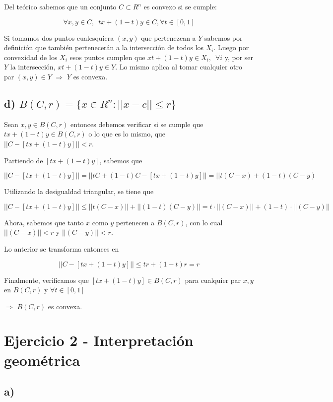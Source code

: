 \documentclass[10pt,a4paper]{report}
\begin{document}
	Del teórico sabemos que un conjunto $C \subset R^n$ es convexo si se cumple:
	
	$$\forall x,y \in C,\hspace{6pt} tx + (1-t)y \in C, \forall t \in [0,1]$$
	
	Si tomamos dos puntos cualesquiera $(x,y)$ que pertenezcan a $Y$ sabemos por definición que también pertenecerán a la intersección de todos los $X_i$. Luego por convexidad de los $X_i$ esos puntos cumplen que $xt + (1-t)y \in X_i, \hspace{6pt} \forall i$ y, por ser $Y$ la intersección, $xt + (1-t)y \in Y$. Lo mismo aplica al tomar cualquier otro par $(x,y)\in Y$ $\Rightarrow$ $Y$ es convexa. 
	
	\subsection*{d) $ B(C,r) = \{x \in R^n : ||x-c|| \leq r\} $}
	
	Sean $x,y \in B(C,r)$ entonces debemos verificar si se cumple que $tx + (1-t)y \in B(C,r)$ o lo que es lo mismo, que 
	$||C - [tx + (1-t)y]|| < r$. 
	
	Partiendo de $[tx + (1-t)y]$, sabemos que
	
	$$||C - [tx + (1-t)y]|| = ||tC + (1-t)C - [tx + (1-t)y]|| = || t(C - x) + (1-t) (C - y) $$
	
	Utilizando la desigualdad triangular, se tiene que 
	
	$$||C - [tx + (1-t)y]|| \leq ||t(C-x)|| + ||(1-t)(C-y)|| = t\cdot||(C-x)|| + (1-t)\cdot||(C-y)||$$
	
	Ahora, sabemos que tanto $x$ como $y$ pertenecen a $B(C,r)$, con lo cual $||(C-x)|| < r$ y $||(C-y)|| < r$.
	
	Lo anterior se transforma entonces en
	
	$$||C - [tx + (1-t)y]|| \leq tr + (1-t)r = r$$
	
	Finalmente, verificamos que $[tx + (1-t)y] \in B(C,r)$ para cualquier par $x,y$ en $B(C,r)$ y $\forall t \in [0,1]$ 
	
	$\Rightarrow$ $B(C,r)$ es convexa.
	
	\section*{Ejercicio 2 - Interpretación geométrica}
	
	\subsection*{a) }
	
\end{document}
